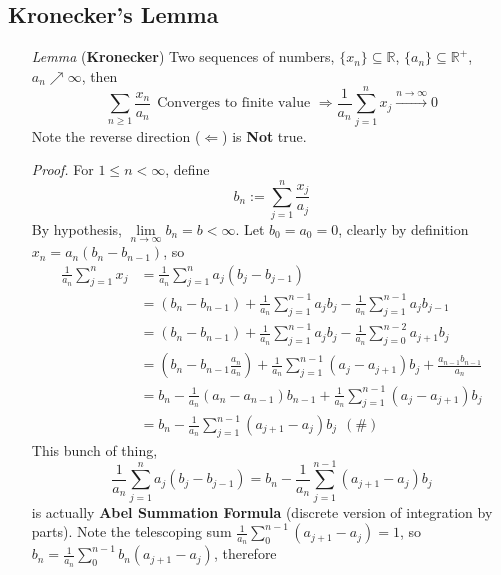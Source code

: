 \documentclass[a4paper,12pt,twoside]{book}
\begin{document}
\subsection{Kronecker's Lemma}
\begin{itemize}
	\item[\textit{Lemma}] (\textbf{Kronecker}) Two sequences of numbers, $\{x_n\}\subseteq \mathbb{R}$, $\{a_n\} \subseteq \mathbb{R}^+$, $a_n \nearrow \infty$, then
	$$\sum_{n\geq 1}\frac{x_n}{a_n}~~\text{Converges to finite value } \Rightarrow \frac{1}{a_n}\sum_{j=1}^n x_j \xrightarrow{n\to \infty}0$$
	Note the reverse direction ($\Leftarrow$) is \textbf{Not} true.

	\item[\textit{Proof.}] For $1\leq n <\infty$, define
	\begin{equation}
		b_n:=\sum_{j=1}^n \frac{x_j}{a_j}
	\end{equation}
	By hypothesis, $\lim\limits_{n\rightarrow\infty}b_n = b < \infty$. Let $b_0=a_0=0$, clearly by definition $x_n = a_n(b_n-b_{n-1})$, so
	\begin{equation}
		\begin{split}
			\frac{1}{a_n}\sum_{j=1}^n x_j &= \frac{1}{a_n} \sum_{j=1}^n a_j(b_j-b_{j-1})\\
			&=(b_n-b_{n-1})+\frac{1}{a_n}\sum_{j=1}^{n-1}a_jb_j-\frac{1}{a_n}\sum_{j=1}^{n-1}a_jb_{j-1}\\
			&=(b_n-b_{n-1})+\frac{1}{a_n}\sum_{j=1}^{n-1}a_jb_j-\frac{1}{a_n}\sum_{j=0}^{n-2}a_{j+1}b_{j}\\
			&=(b_n-b_{n-1}\frac{a_n}{a_n})+\frac{1}{a_n}\sum_{j=1}^{n-1}(a_j-a_{j+1})b_j+\frac{a_{n-1}b_{n-1}}{a_n}\\
			&=b_n-\frac{1}{a_n}(a_n-a_{n-1})b_{n-1}+\frac{1}{a_n}\sum_{j=1}^{n-1}(a_j-a_{j+1})b_j\\
			&=b_n-\frac{1}{a_n}\sum_{j=1}^{n-1}(a_{j+1}-a_j)b_j~~(\#)
		\end{split}
	\end{equation}
	This bunch of thing,
	\begin{equation}
		\frac{1}{a_n} \sum_{j=1}^n a_j(b_j-b_{j-1}) = b_n-\frac{1}{a_n}\sum_{j=1}^{n-1}(a_{j+1}-a_j)b_j
	\end{equation}
	is actually \textbf{Abel Summation Formula} (discrete version of integration by parts).\newline
	Note the telescoping sum $\frac{1}{a_n}\sum_0^{n-1}(a_{j+1}-a_j)=1$, so $b_n = \frac{1}{a_n}\sum_0^{n-1}b_n(a_{j+1}-a_j)$, therefore
	\begin{equation}

\end{equation}
\end{itemize}
\end{document}
